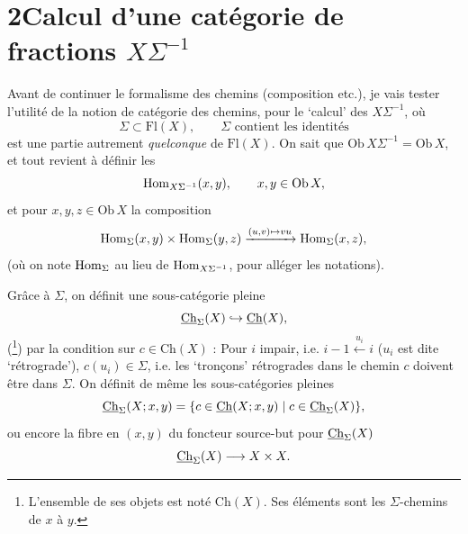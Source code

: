 
\section*{2\quad Calcul d'une catégorie de fractions $X\Sigma^{-1}$}

Avant de continuer le formalisme des chemins (composition etc.), je vais tester l'utilité de la notion de catégorie des chemins, pour le `calcul' des $X\Sigma^{-1}$, où
\[
\Sigma\subset\mathrm{Fl}(X),\qquad\Sigma\text{ contient les identités}
\]
est une partie autrement \textit{quelconque} de $\mathrm{Fl}(X)$. On sait que $\mathrm{Ob}\,X\Sigma^{-1}=\mathrm{Ob}\,X$, et tout revient à définir les
\[
\mathrm{Hom}_{X\Sigma^{-1}}(x,y),\qquad x,y\in\mathrm{Ob}\,X,
\]
et pour $x,y,z\in\mathrm{Ob}\,X$ la composition
\[
\mathrm{Hom}_\Sigma(x,y)\times\mathrm{Hom}_\Sigma(y,z)\xrightarrow{(u,v)\mapsto vu}\mathrm{Hom}_\Sigma(x,z),
\]
(où on note $\mathrm{Hom}_\Sigma$ au lieu de $\mathrm{Hom}_{X\Sigma^{-1}}$, pour alléger les notations).

Grâce à $\Sigma$, on définit une sous-catégorie pleine
\[
\underline{\mathrm{Ch}}_\Sigma(X)\hookrightarrow\underline{\mathrm{Ch}}(X),
\]
(\footnote[3]{L'ensemble de ses objets est noté $\mathrm{Ch}(X)$. Ses éléments sont les $\Sigma$-chemins de $x$ à $y$.}) par la condition sur $c\in\mathrm{Ch}(X)$ : Pour $i$ impair, i.e. $i-1\xleftarrow{u_i}i$ ($u_i$ est dite `rétrograde'), $c(u_i)\in\Sigma$, i.e. les `tronçons' rétrogrades dans le chemin $c$ doivent être dans $\Sigma$. On définit de même les sous-catégories pleines
\[
\underline{\mathrm{Ch}}_\Sigma(X;x,y)=\{c\in\underline{\mathrm{Ch}}(X;x,y)\mid c\in\underline{\mathrm{Ch}}_\Sigma(X)\},
\]
ou encore la fibre en $(x,y)$ du foncteur source-but pour $\underline{\mathrm{Ch}}_\Sigma(X)$
\[
\underline{\mathrm{Ch}}_\Sigma(X)\longrightarrow X\times X.
\]

